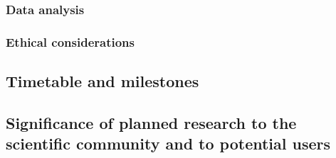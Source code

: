 \documentclass[12pt]{article}
\begin{document}
\subsubsection{Data analysis}

\lipsum[1-3]

\subsubsection{Ethical considerations}

\lipsum[1-2]

\subsection{Timetable and milestones}

\lipsum[1-2]

\subsection{Significance of planned research to the scientific community and to potential users}

\lipsum[1-2]

\printbibliography  
\end{document}
